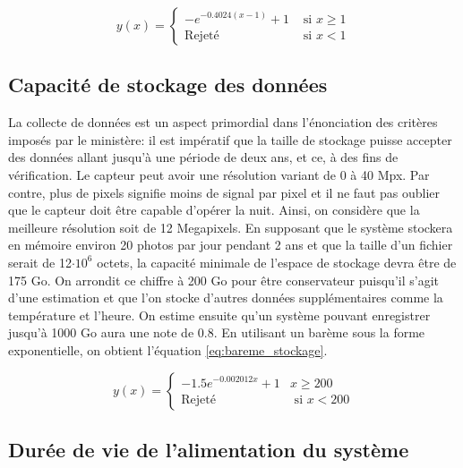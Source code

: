 \begin{equation}
y(x) = \begin{cases}
        -e^{-0.4024(x-1)}+1 & \text{ si } x \geq 1\\
        \text{Rejeté} & \text{ si } x < 1
    \end{cases}
    \label{eq:bareme_volume_analyse}
\end{equation}


\subsection{Capacité de stockage des données}
\label{subsection:capacite_stockage}

La collecte de données est un aspect primordial dans l'énonciation des critères imposés par le ministère: il est impératif que la taille de stockage puisse accepter des données allant jusqu'à une période de deux ans, et ce, à des fins de vérification. Le capteur peut avoir une résolution variant de 0 à 40 Mpx. Par contre, plus de pixels signifie moins de signal par pixel et il ne faut pas oublier que le capteur doit être capable d'opérer la nuit. Ainsi, on considère que la meilleure résolution soit de 12 Megapixels. En supposant que le système stockera en mémoire environ 20 photos par jour pendant 2 ans et que la taille d'un fichier serait de 12$\cdot 10^6$ octets, la capacité minimale de l'espace de stockage devra être de 175 Go. On arrondit ce chiffre à 200 Go pour être conservateur puisqu'il s'agit d'une estimation et que l'on stocke d'autres données supplémentaires comme la température et l'heure. On estime ensuite qu'un système pouvant enregistrer jusqu'à 1000 Go aura une note de 0.8. En utilisant un barème sous la forme exponentielle, on obtient l'équation \ref{eq:bareme_stockage}.

\begin{equation}
    y(x) = \begin{cases}
        -1.5e^{-0.002012x} + 1 & x \geq 200  \\      \text{Rejeté} & \text{ si } x < 200
    \end{cases}
    \label{eq:bareme_stockage}
\end{equation}


\subsection{Durée de vie de l'alimentation du système}

